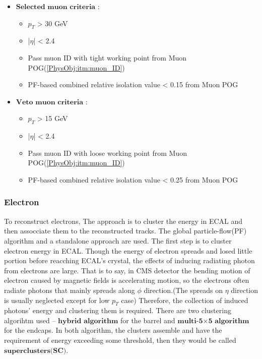 			\begin{itemize}
				\item $\textbf{Selected muon criteria}$ : 
					\begin{itemize}
						\item $p_T$ > 30 GeV
						\item |$\eta$| < 2.4
						\item Pass muon ID with tight working point from Muon POG\cite{muon_POG}(\ref{PhysObj:itm:muon_ID})
						\item PF-based combined relative isolation value < 0.15 from Muon POG\cite{muon_POG}
					\end{itemize}
				\item $\textbf{Veto muon criteria}$ : 
					\begin{itemize}
						\item $p_T$ > 15 GeV
						\item |$\eta$| < 2.4
						\item Pass muon ID with loose working point from Muon POG\cite{muon_POG}(\ref{PhysObj:itm:muon_ID})
						\item PF-based combined relative isolation value < 0.25 from Muon POG\cite{muon_POG}
					\end{itemize}
			\label{PhysObj:itm:muon_selection}
			\end{itemize}
			
		\subsubsection{Electron}
		\label{sssec:PhysObj_ElectronReco}

			To reconstruct electrons, The approach is to cluster the energy in ECAL and then assocciate them to the reconstructed tracks. The global particle-flow(PF) algorithm and a standalone approach are used. The first step is to cluster electron energy in ECAL. Though the energy of electron spreads and losed little portion before reacching ECAL's crystal, the effects of inducing radiating photon from electrons are large. That is to say, in CMS detector the bending motion of electron caused by magnetic fields is accelerating motion, so the electrons often radiate photons that mainly spreads along $\phi$ direction.(The spreads on $\eta$ direction is usually neglected except for low $p_T$ case) Therefore, the collection of induced photons' energy and clustering them is required. There are two clustering algorihtm used -- $\textbf{hybrid}$ $\textbf{algorithm}$ for the barrel and $\textbf{multi-5}$$\times$$\textbf{5}$ $\textbf{algorithm}$ for the endcaps. In both algorithm, the clusters assemble and have the requirement of energy exceeding some threshold, then they would be called $\textbf{superclusters(SC)}$.

